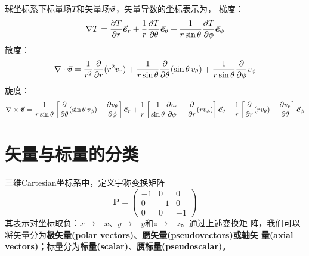球坐标系下标量场$T$和矢量场$\vec{\bm{v}}$，矢量导数的坐标表示为，\newline
梯度：
\begin{equation}
    \nabla T = \frac{\partial T}{\partial r} \vec{\bm{e}}_r
              +\frac{1}{r} \frac{\partial T}{\partial \theta} \vec{\bm{e}}_{\theta}
              +\frac{1}{r\sin{\theta}}\frac{\partial T}{\partial \phi} \vec{\bm{e}}_{\phi}
    \label{eq:sphere-gradient}
\end{equation}
散度：
\begin{equation}
    \nabla \cdot \vec{\bm{v}} = \frac{1}{r^2} \frac{\partial}{\partial r}(r^2 v_r)
      + \frac{1}{r\sin{\theta}}\frac{\partial}{\partial\theta}(\sin{\theta}\, v_{\theta})
      + \frac{1}{r\sin{\theta}}\frac{\partial}{\partial\phi} v_{\phi}
    \label{eq:sphere-divergence}
\end{equation}
旋度：
\begin{equation}
    \nabla \times \vec{\bm{v}} =
    \frac{1}{r\sin{\theta}}\left[ \frac{\partial}{\partial\theta}(\sin{\theta}\,v_{\phi}) 
                      - \frac{\partial v_{\theta}}{\partial\phi}\right] \vec{\bm{e}}_r
     +\frac{1}{r} \left[ \frac{1}{\sin{\theta}} \frac{\partial v_{r}}{\partial \phi} 
                 - \frac{\partial}{\partial r}(r v_{\phi})\right] \vec{\bm{e}}_{\theta}
     +\frac{1}{r}\left[\frac{\partial}{\partial r}(r v_{\theta})
                 - \frac{\partial v_{r}}{{\partial \theta}} \right] \vec{\bm{e}}_{\phi}
    \label{eq:sphere-curl}
\end{equation}

\section{矢量与标量的分类}
三维Cartesian坐标系中，定义宇称变换矩阵
\begin{equation}
    \bm{P} = \begin{pmatrix}
        -1  &   0   &   0   \\
         0  &  -1   &   0   \\
         0  &   0   &  -1 
    \end{pmatrix}
    \label{eq:inverse-matrix}
\end{equation}
其表示对坐标取负：$x\rightarrow -x$、$y\rightarrow -y$和$z\rightarrow -z$。通过上述变换矩
阵，我们可以将矢量分为\textbf{极矢量(polar vectors)}、\textbf{赝矢量(pseudovectors)或轴矢
量(axial vectors)}；标量分为\textbf{标量(scalar)}、\textbf{赝标量(pseudoscalar)}。

